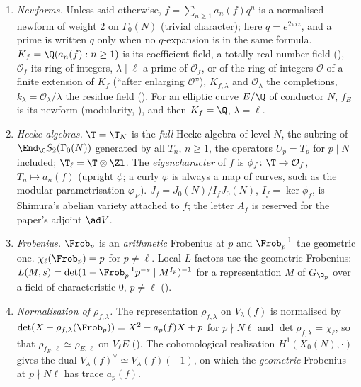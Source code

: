 \begin{convention}\label{conv:modgalrep:notation}
\begin{enumerate}[label=(\alph*)]
\item \emph{Newforms.} Unless said otherwise, $f=\sum_{n\ge1}a_n(f)q^n$ is a normalised newform of weight $2$ on $\Gamma_0(N)$ (trivial character); here $q=e^{2\pi
iz}$, and a prime is written $q$ only when no $q$-expansion is in the same formula. $K_f=\Q(a_n(f):n\ge1)$ is its coefficient field, a totally real
number field (), $\mathcal{O}_f$ its ring of integers, $\lambda\mid\ell$ a prime of $\mathcal{O}_f$, or of the ring of integers $\mathcal{O}$ of a finite
extension of $K_f$ (``after enlarging $\mathcal{O}$''), $K_{f,\lambda}$ and $\mathcal{O}_\lambda$ the completions, $k_\lambda=\mathcal{O}_\lambda/\lambda$ the residue field ().
For an elliptic curve $E/\Q$ of conductor $N$, $f_E$ is its newform (modularity, ), and then $K_f=\Q$, $\lambda=\ell$.
\item \emph{Hecke algebras.} $\T=\T_N$ is the \emph{full} Hecke algebra of level $N$, the subring of $\End_\C S_2(\Gamma_0(N))$ generated by all $T_n$, $n\ge1$,
the operators $U_p=T_p$ for $p\mid N$ included; $\T_\ell=\T\otimes\Zl$. The \emph{eigencharacter} of $f$ is $\phi_f\colon\T\to\mathcal{O}_f$, $T_n\mapsto a_n(f)$ (upright
$\phi$; a curly $\varphi$ is always a map of curves, such as the modular parametrisation $\varphi_E$). $J_f=J_0(N)/I_fJ_0(N)$, $I_f=\ker\phi_f$, is
Shimura's abelian variety attached to $f$; the letter $A_f$ is reserved for the paper's adjoint $\ad V$.
\item \emph{Frobenius.} $\Frob_p$ is an \emph{arithmetic} Frobenius at $p$ and $\Frob_p^{-1}$ the geometric one.
$\chi_\ell(\Frob_p)=p$ for $p\ne\ell$. Local $L$-factors use the geometric Frobenius: $L(M,s)=\det(1-\Frob_p^{-1}p^{-s}\mid M^{I_p})^{-1}$ for a representation $M$ of
$G_{\Q_p}$ over a field of characteristic $0$, $p\ne\ell$ ().
\item \emph{Normalisation of $\rho_{f,\lambda}$.} The representation $\rho_{f,\lambda}$ on $V_\lambda(f)$ is normalised by $\det(X-\rho_{f,\lambda}(\Frob_p))=X^2-a_p(f)X+p$ for $p\nmid N\ell$
and $\det\rho_{f,\lambda}=\chi_\ell$, so that $\rho_{f_E,\ell}\simeq\rho_{E,\ell}$ on $V_\ell E$ (). The cohomological realisation
$H^1(X_0(N),\cdot)$ gives the dual $V_\lambda(f)^\vee\simeq V_\lambda(f)(-1)$, on which the \emph{geometric} Frobenius at $p\nmid N\ell$ has trace $a_p(f)$.

\end{enumerate}
\end{convention}
